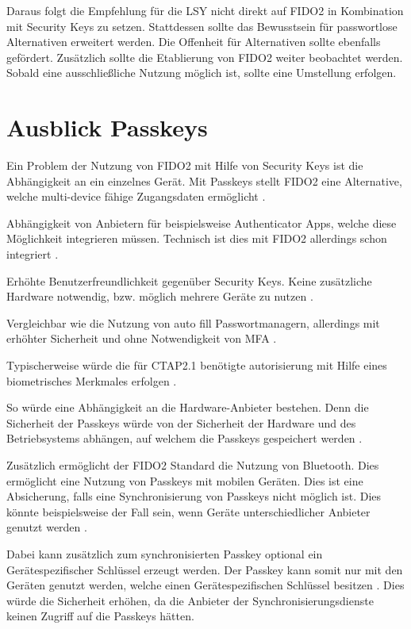 Daraus folgt die Empfehlung für die \ac{LSY} nicht direkt auf FIDO2 in Kombination mit Security Keys zu setzen. Stattdessen sollte das Bewusstsein für passwortlose Alternativen erweitert werden. Die Offenheit für Alternativen sollte ebenfalls gefördert. Zusätzlich sollte die Etablierung von FIDO2 weiter beobachtet werden. Sobald eine ausschließliche Nutzung möglich ist, sollte eine Umstellung erfolgen.

\chapter{Ausblick Passkeys}
Ein Problem der Nutzung von FIDO2 mit Hilfe von Security Keys ist die Abhängigkeit an ein einzelnes Gerät. Mit Passkeys stellt FIDO2 eine Alternative, welche multi-device fähige Zugangsdaten ermöglicht \cite{usecasfido}.

Abhängigkeit von Anbietern für beispielsweise Authenticator Apps, welche diese Möglichkeit integrieren müssen. Technisch ist dies mit FIDO2 allerdings schon integriert \cite{usecasfido}.

Erhöhte Benutzerfreundlichkeit gegenüber Security Keys. Keine zusätzliche Hardware notwendig, bzw. möglich mehrere Geräte zu nutzen \cite{usecasfido}.

Vergleichbar wie die Nutzung von auto fill Passwortmanagern, allerdings mit erhöhter Sicherheit und ohne Notwendigkeit von \ac{MFA} \cite{usecasfido} \cite{passkeysgoogle}.

Typischerweise würde die für CTAP2.1 benötigte autorisierung mit Hilfe eines biometrisches Merkmales erfolgen \cite{usecasfido}.

So würde eine Abhängigkeit an die Hardware-Anbieter bestehen. Denn die Sicherheit der Passkeys würde von der Sicherheit der Hardware und des Betriebsystems abhängen, auf welchem die Passkeys gespeichert werden \cite{usecasfido}.

Zusätzlich ermöglicht der FIDO2 Standard die Nutzung von Bluetooth. Dies ermöglicht eine Nutzung von Passkeys mit mobilen Geräten. Dies ist eine Absicherung, falls eine Synchronisierung von Passkeys nicht möglich ist. Dies könnte beispielsweise der Fall sein, wenn Geräte unterschiedlicher Anbieter genutzt werden \cite{usecasfido}.

Dabei kann zusätzlich zum synchronisierten Passkey optional ein Gerätespezifischer Schlüssel erzeugt werden. Der Passkey kann somit nur mit den Geräten genutzt werden, welche einen Gerätespezifischen Schlüssel besitzen \cite{usecasfido}. Dies würde die Sicherheit erhöhen, da die Anbieter der Synchronisierungsdienste keinen Zugriff auf die Passkeys hätten.

